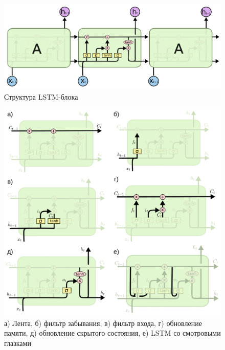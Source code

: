 \begin{figure}[htb]
    \centering
    \includegraphics[scale=0.31]{images/lstm-block.png}
    \caption{Структура LSTM-блока}
\end{figure}

\begin{figure}
    \centering
    \includegraphics[scale=0.18]{images/lstm.png}
    \caption{а) Лента,  б) фильтр забывания, в) фильтр входа, г) обновление памяти, д) обновление скрытого состояния, е) LSTM со смотровыми глазками}
\end{figure}

